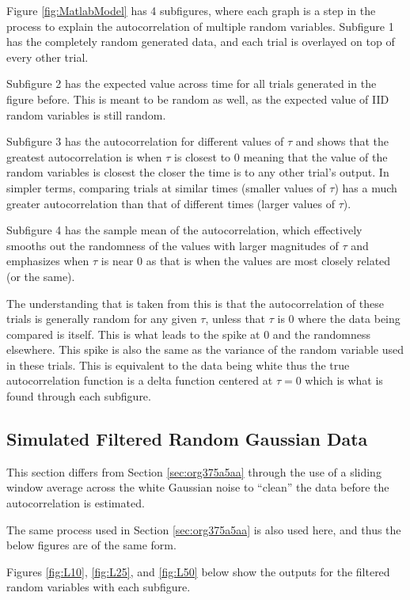 \documentclass[a4paper, 11pt]{article}
\begin{document}
\pagebreak

Figure \ref{fig:MatlabModel} has 4 subfigures, where each graph is a step in the process to explain the autocorrelation of multiple random variables.
Subfigure 1 has the completely random generated data, and each trial is overlayed on top of every other trial.

Subfigure 2 has the expected value across time for all trials generated in the figure before. This is meant to be random as well, as the expected value of IID random variables is still random.

Subfigure 3 has the autocorrelation for different values of \(\tau\) and shows that the greatest autocorrelation is when \(\tau\) is closest to 0 meaning that the value of the random variables is closest the closer the time is to any other trial's output. In simpler terms, comparing trials at similar times (smaller values of \(\tau\)) has a much greater autocorrelation than that of different times (larger values of \(\tau\)).

Subfigure 4 has the sample mean of the autocorrelation, which effectively smooths out the randomness of the values with larger magnitudes of \(\tau\) and emphasizes when \(\tau\) is near 0 as that is when the values are most closely related (or the same).

The understanding that is taken from this is that the autocorrelation of these trials is generally random for any given \(\tau\), unless that \(\tau\) is 0 where the data being compared is itself. This is what leads to the spike at 0 and the randomness elsewhere. This spike is also the same as the variance of the random variable used in these trials.
This is equivalent to the data being white thus the true autocorrelation function is a delta function centered at \(\tau = 0\) which is what is found through each subfigure.

\subsection{Simulated Filtered Random Gaussian Data}
\label{sec:orgb3c6090}
This section differs from Section \ref{sec:org375a5aa} through the use of a sliding window average across the white Gaussian noise to ``clean'' the data before the autocorrelation is estimated.

The same process used in Section \ref{sec:org375a5aa} is also used here, and thus the below figures are of the same form.

Figures \ref{fig:L10}, \ref{fig:L25}, and \ref{fig:L50} below show the outputs for the filtered random variables with each subfigure.
\end{document}

